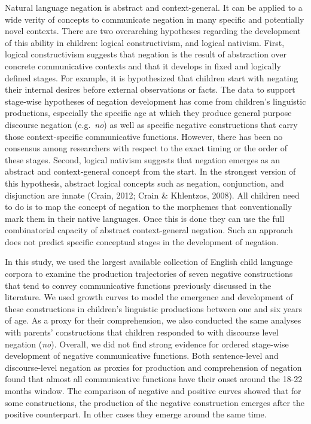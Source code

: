 \documentclass[
  man,floatsintext]{apa6}
\begin{document}
Natural language negation is abstract and context-general. It can be applied to a wide verity of concepts to communicate negation in many specific and potentially novel contexts. There are two overarching hypotheses regarding the development of this ability in children: logical constructivism, and logical nativism. First, logical constructivism suggests that negation is the result of abstraction over concrete communicative contexts and that it develops in fixed and logically defined stages. For example, it is hypothesized that children start with negating their internal desires before external observations or facts. The data to support stage-wise hypotheses of negation development has come from children's linguistic productions, especially the specific age at which they produce general purpose discourse negation (e.g.~\emph{no}) as well as specific negative constructions that carry those context-specific communicative functions. However, there has been no consensus among researchers with respect to the exact timing or the order of these stages. Second, logical nativism suggests that negation emerges as an abstract and context-general concept from the start. In the strongest version of this hypothesis, abstract logical concepts such as negation, conjunction, and disjunction are innate (Crain, 2012; Crain \& Khlentzos, 2008). All children need to do is to map the concept of negation to the morphemes that conventionally mark them in their native languages. Once this is done they can use the full combinatorial capacity of abstract context-general negation. Such an approach does not predict specific conceptual stages in the development of negation.

In this study, we used the largest available collection of English child language corpora to examine the production trajectories of seven negative constructions that tend to convey communicative functions previously discussed in the literature. We used growth curves to model the emergence and development of these constructions in children's linguistic productions between one and six years of age. As a proxy for their comprehension, we also conducted the same analyses with parents' constructions that children responded to with discourse level negation (\emph{no}). Overall, we did not find strong evidence for ordered stage-wise development of negative communicative functions. Both sentence-level and discourse-level negation as proxies for production and comprehension of negation found that almost all communicative functions have their onset around the 18-22 months window. The comparison of negative and positive curves showed that for some constructions, the production of the negative construction emerges after the positive counterpart. In other cases they emerge around the same time.
\end{document}

